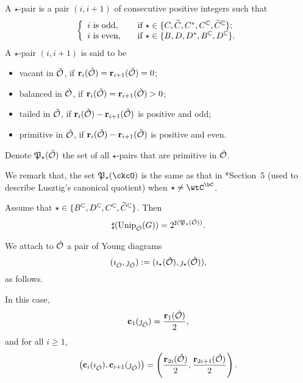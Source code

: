 \documentclass[counting_main.tex]{subfiles}
\begin{document}
\begin{defn}
  A $\star$-pair is a pair $(i,i+1)$ of consecutive positive integers such that
  \[
    \left\{
      \begin{array}{ll}
        i\textrm{ is odd}, \quad &\textrm{if $\star\in\{C, \widetilde{C}, C^*, C^{\mathbb{C}}, \widetilde C^{\mathbb{C}}\}$};  \\
        i \textrm{ is even}, \quad &\textrm{if $\star\in\{B, D, D^*, B^{\mathbb{C}}, D^{\mathbb{C}}\}$}. \\
      \end{array}
    \right.
  \]
  A $\star$-pair $(i,i+1)$ is said to be
  \begin{itemize}
    \item vacant in $\check {{\mathcal {O}}}$, if
          $\mathbf r_i(\check {{\mathcal {O}}})=\mathbf r_{i+1}(\check {{\mathcal {O}}})=0$;
    \item balanced in $\check {{\mathcal {O}}}$, if
          $\mathbf r_i(\check {{\mathcal {O}}})=\mathbf r_{i+1}(\check {{\mathcal {O}}})>0$;
    \item tailed in $\check {{\mathcal {O}}}$, if
          $\mathbf r_i(\check {{\mathcal {O}}})-\mathbf r_{i+1}(\check {{\mathcal {O}}})$ is positive and
          odd;
    \item primitive in $\check {{\mathcal {O}}}$, if
          $\mathbf r_i(\check {{\mathcal {O}}})-\mathbf r_{i+1}(\check {{\mathcal {O}}})$ is positive and
          even.
  \end{itemize}
  Denote $\mathfrak{P}_\star(\check {{\mathcal {O}}})$ the set of all $\star$-pairs that are
  primitive in $\check {{\mathcal {O}}}$.
\end{defn}
We remark that, the set $\CPP_{\star}(\ckcO)$ is the same as that in
\cite{So}*{Section~5}
(used to describe Lusztig's canonical quotient) when $\star\neq \wtC^{\bC}$.


\begin{thm}\label{complex}
  Assume that $\star\in \{B^{\mathbb{C}},D^{\mathbb{C}}, C^{\mathbb{C}}, \widetilde C^{\mathbb{C}}\}$. Then
  \[
    \sharp(\mathrm{Unip}_{\check {{\mathcal {O}}}}(G))=2^{\sharp(\mathfrak{P}_\star(\check {{\mathcal {O}}}))} .
  \]
\end{thm}


We attach to $\check {{\mathcal {O}}}$ a pair of Young diagrams
\[
  (\imath_{\check {{\mathcal {O}}}}, \jmath_{\check {{\mathcal {O}}}}):=(\imath_\star(\check {{\mathcal {O}}}), \jmath_\star(\check {{\mathcal {O}}})),
\]
as follows.

\medskip

 In this case,
\[
  \mathbf c_{1}(\jmath_{\check {{\mathcal {O}}}})=\frac{\mathbf r_1(\check {{\mathcal {O}}})}{2},
\]
and for all $i\geq 1$,
\[
  \left (\mathbf c_{i}(\imath_{\check {{\mathcal {O}}}}), \mathbf c_{i+1}(\jmath_{\check {{\mathcal {O}}}})\right )= \left (\frac{\mathbf r_{2i}(\check {{\mathcal {O}}})}{2}, \frac{\mathbf r_{2i+1}(\check {{\mathcal {O}}})}{2}\right ).
\]
\end{document}

